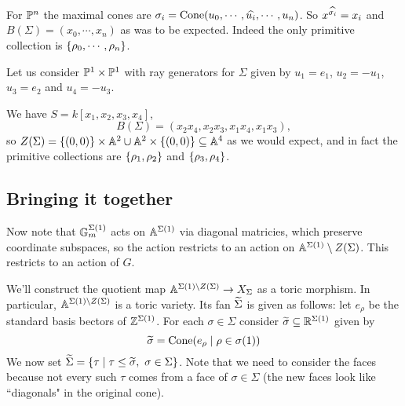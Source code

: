 \begin{example}
For $\mathbb{P}^n$ the maximal cones are $\sigma_i=\operatorname{Cone}(u_0,\cdots, \widehat{u_i},\cdots, u_n)$. So $x^{\widehat{\sigma_i}}=x_i$ and $B(\Sigma)=(x_0,\cdots, x_n)$ as was to be expected. Indeed the only primitive collection is $\left\{{\rho_0,\cdots, \rho_n}\right\}$.
\end{example}

\begin{example}
Let us consider $\mathbb{P}^1\times\mathbb{P}^1$ with ray generators for $\Sigma$ given by $u_1=e_1$, $u_2=-u_1$, $u_3=e_2$ and $u_4=-u_3$.

We have $S=k[x_1,x_2,x_3,x_4]$, 
\[B(\Sigma)=(x_2x_4,x_2x_3,x_1x_4,x_1x_3),\] 
so $Z(\Sigma)=\left\{{(0,0)}\right\}\times \mathbb{A}^2\cup \mathbb{A}^2\times\left\{{(0,0)}\right\}\subseteq \mathbb{A}^4$ as we would expect, and in fact the primitive collections are $\left\{{\rho_1,\rho_2}\right\}$ and $\left\{{\rho_3,\rho_4}\right\}$.
\end{example}


\subsection{Bringing it together}
Now note that $\mathbb{G}_m^{\Sigma(1)}$ acts on $\mathbb{A}^{\Sigma(1)}$ via diagonal matricies, which preserve coordinate subspaces, so the action restricts to an action on $\mathbb{A}^{\Sigma(1)}\setminus Z(\Sigma)$. This restricts to an action of $G$.


We'll construct the quotient map $\mathbb{A}^{\Sigma(1)\setminus{Z(\Sigma)}}\to X_{\Sigma}$ as a toric morphism. In particular, $\mathbb{A}^{\Sigma(1)\setminus{Z(\Sigma)}}$ is a toric variety. Its fan $\widetilde{\Sigma}$ is given as follows: let $e_\rho$ be the standard basis bectors of $\mathbb{Z}^{\Sigma(1)}$. For each $\sigma\in \Sigma$ consider $\widetilde{\sigma}\subseteq \mathbb{R}^{\Sigma(1)}$ given by
\[\widetilde{\sigma}=\operatorname{Cone}(e_\rho\mid \rho\in \sigma(1))\]
We now set $\wt \Sigma=\cpa{\tau\mid \tau\leq \wt \sigma,\ \sigma\in \Sigma}$. Note that we need to consider the faces because not every such $\tau$ comes from a face of $\sigma\in \Sigma$ (the new faces look like ``diagonals" in the original cone).

